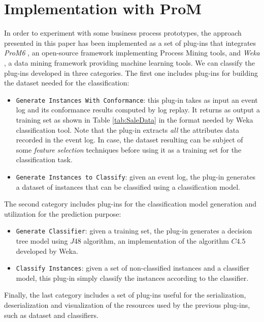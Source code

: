 \documentclass{llncs}
\begin{document}
\section{Implementation with ProM}\label{implementation}
In order to experiment with some business process prototypes, the approach presented in this paper has been implemented as a set of plug-ins that integrates \emph{ProM6} \cite{6}, an open-source framework implementing Process Mining tools, and \emph{Weka} \cite{7}, a data mining framework providing machine learning tools.
We can classify the plug-ins developed in three categories. The first one includes plug-ins for building the dataset needed for the classification:
\begin{itemize}
\item \texttt{Generate Instances With Conformance}: this plug-in takes as input an event log and its conformance results computed by log replay. It returns as output a training set as shown in Table \ref{tab:SaleData} in the format needed by Weka classification tool. Note that the plug-in extracts \emph{all} the attributes data recorded in the event log. In case, the dataset resulting can be subject of some \emph{feature selection} techniques before using it as a training set for the classification task.  

\item \texttt{Generate Instances to Classify}: given an event log, the plug-in generates a dataset of instances that can be classified using a classification model.
\end{itemize}
The second category includes plug-ins for the classification model generation and utilization for the prediction purpose:
\begin{itemize}
\item \texttt{Generate Classifier}: given a training set, the plug-in generates a decision tree model using $J48$ algorithm, an implementation of the algorithm $C4.5$ developed by Weka.
\item \texttt{Classify Instances}: given a set of non-classified instances and a classifier model, this plug-in simply classify the instances according to the classifier.
\end{itemize}
Finally, the last category includes a set of plug-ins useful for the serialization, deserialization and visualization of the resources used by the previous plug-ins, such as dataset and classifiers. 
\end{document}
